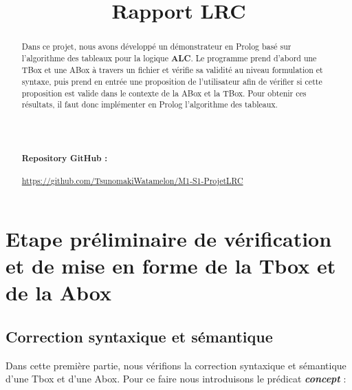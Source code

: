 \documentclass{rapportECL}
\title{Rapport LRC} %
\begin{document}




        
\fairemarges %
\fairepagedegarde %


\begin{abstract}
Dans ce projet, nous avons développé un démonstrateur en Prolog basé sur l'algorithme des tableaux pour la logique \textbf{ALC}.
Le programme prend d'abord une TBox et une ABox à travers un fichier et vérifie sa validité au niveau formulation et syntaxe, puis prend en entrée une proposition de l'utilisateur afin de vérifier si cette proposition est valide dans le contexte de la ABox et la TBox.
Pour obtenir ces résultats, il faut donc implémenter en Prolog l'algorithme des tableaux.

\\
\\


\paragraph{Repository GitHub : } \url{https://github.com/TsunomakiWatamelon/M1-S1-ProjetLRC}

\end{abstract}

\newpage

\tabledematieres %

\section{Etape préliminaire de vérification et de mise en
forme de la Tbox et de la Abox}

\subsection{Correction syntaxique et sémantique}

Dans cette première partie, nous vérifions la correction syntaxique et sémantique d'une Tbox et
d’une Abox. Pour ce faire nous introduisons le prédicat \textbf{\textit{concept}} :
\end{document}
